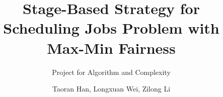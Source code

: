 \documentclass[aspectratio=169]{beamer}
\title{Stage-Based Strategy for \\ Scheduling Jobs Problem with Max-Min Fairness}
\subtitle{Project for Algorithm and Complexity }
\author{Taoran Han, Longxuan Wei, Zilong Li}
\institute{Department of\\ Computer Science}
\begin{document}
    
    \makebottom
\end{document}
